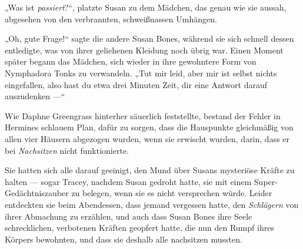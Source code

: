 \later

„Was ist \emph{passiert}?“, platzte Susan zu dem Mädchen, das genau wie sie aussah, abgesehen von den verbrannten, schweißnassen Umhängen.

„Oh, gute Frage!“ sagte die andere Susan Bones, während sie sich schnell dessen entledigte, was von ihrer geliehenen Kleidung noch übrig war. Einen Moment später begann das Mädchen, sich wieder in ihre gewohntere Form von Nymphadora Tonks zu verwandeln.
„Tut mir leid, aber mir ist selbst nichts eingefallen, also hast du etwa drei Minuten Zeit, dir eine Antwort darauf auszudenken —“

\later

Wie Daphne Greengrass hinterher säuerlich feststellte, bestand der Fehler in Hermines schlauem Plan, dafür zu sorgen, dass die Hauspunkte gleichmäßig von allen vier Häusern abgezogen wurden, wenn sie erwischt wurden, darin, dass er bei \emph{Nachsitzen} nicht funktionierte.

Sie hatten sich alle darauf geeinigt, den Mund über Susans mysteriöse Kräfte zu halten — sogar Tracey, nachdem Susan gedroht hatte, sie mit einem Super-Gedächtniszauber zu belegen, wenn sie es nicht versprechen würde. Leider entdeckten sie beim Abendessen, dass jemand vergessen hatte, den \emph{Schlägern} von ihrer Abmachung zu erzählen, und auch dass Susan Bones ihre Seele schrecklichen, verbotenen Kräften geopfert hatte, die nun den Rumpf ihres Körpers bewohnten, und dass sie deshalb alle nachsitzen mussten.

